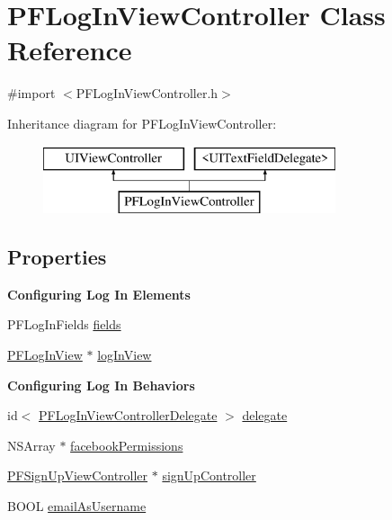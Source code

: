 \hypertarget{interface_p_f_log_in_view_controller}{}\section{P\+F\+Log\+In\+View\+Controller Class Reference}
\label{interface_p_f_log_in_view_controller}


{\ttfamily \#import $<$P\+F\+Log\+In\+View\+Controller.\+h$>$}

Inheritance diagram for P\+F\+Log\+In\+View\+Controller\+:\begin{figure}[H]
\begin{center}
\leavevmode
\includegraphics[height=2.000000cm]{interface_p_f_log_in_view_controller}
\end{center}
\end{figure}
\subsection*{Properties}
\begin{Indent}{\bf Configuring Log In Elements}\par
{\em 

 

 }\begin{DoxyCompactItemize}
\item 
P\+F\+Log\+In\+Fields \hyperlink{interface_p_f_log_in_view_controller_a9e150a6faf7e08e6bcfb5f120c02ba6f}{fields}
\item 
\hyperlink{interface_p_f_log_in_view}{P\+F\+Log\+In\+View} $\ast$ \hyperlink{interface_p_f_log_in_view_controller_a705c69f6a99cfaf962831623b4d6ccff}{log\+In\+View}
\end{DoxyCompactItemize}
\end{Indent}
\begin{Indent}{\bf Configuring Log In Behaviors}\par
{\em 

 

 }\begin{DoxyCompactItemize}
\item 
id$<$ \hyperlink{protocol_p_f_log_in_view_controller_delegate-p}{P\+F\+Log\+In\+View\+Controller\+Delegate} $>$ \hyperlink{interface_p_f_log_in_view_controller_aee5f26d00a8aa4fa970c0ee8edf18e5b}{delegate}
\item 
N\+S\+Array $\ast$ \hyperlink{interface_p_f_log_in_view_controller_aa6a5f7937240b2bc552a764b3108d7dd}{facebook\+Permissions}
\item 
\hyperlink{interface_p_f_sign_up_view_controller}{P\+F\+Sign\+Up\+View\+Controller} $\ast$ \hyperlink{interface_p_f_log_in_view_controller_a3b23bb61ef95e3e9418f2f6d29420425}{sign\+Up\+Controller}
\item 
B\+O\+O\+L \hyperlink{interface_p_f_log_in_view_controller_a26e4396d8e549640b53d2ec74d7f4a55}{email\+As\+Username}
\end{DoxyCompactItemize}
\end{Indent}


